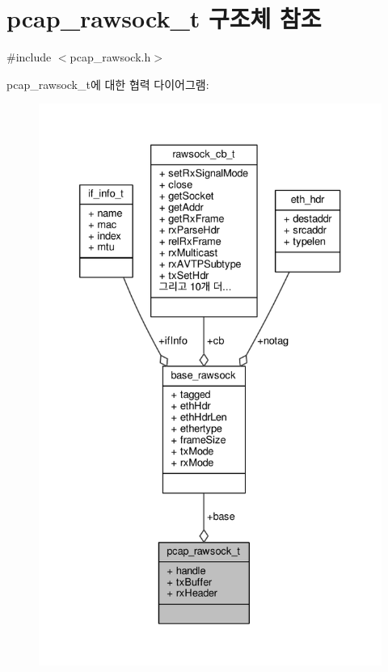 \hypertarget{structpcap__rawsock__t}{}\section{pcap\+\_\+rawsock\+\_\+t 구조체 참조}
\label{structpcap__rawsock__t}


{\ttfamily \#include $<$pcap\+\_\+rawsock.\+h$>$}



pcap\+\_\+rawsock\+\_\+t에 대한 협력 다이어그램\+:
\nopagebreak
\begin{figure}[H]
\begin{center}
\leavevmode
\includegraphics[width=333pt]{structpcap__rawsock__t__coll__graph}
\end{center}
\end{figure}
